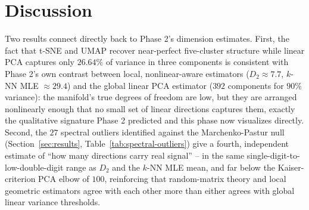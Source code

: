 \documentclass[11pt]{article}
\begin{document}
\section{Discussion}
\label{sec:discussion}

Two results connect directly back to Phase 2's dimension estimates. First,
the fact that t-SNE and UMAP recover near-perfect five-cluster structure
while linear PCA captures only $26.64\%$ of variance in three components
is consistent with Phase 2's own contrast between local, nonlinear-aware
estimators ($D_2 \approx 7.7$, $k$-NN MLE $\approx 29.4$) and the global
linear PCA estimator ($392$ components for $90\%$ variance): the manifold's
true degrees of freedom are low, but they are arranged nonlinearly enough
that no small set of linear directions captures them, exactly the
qualitative signature Phase 2 predicted and this phase now visualizes
directly. Second, the $27$ spectral outliers identified against the
Marchenko-Pastur null (Section~\ref{sec:results}, Table~\ref{tab:spectral-outliers})
give a fourth, independent estimate of ``how many directions carry real
signal'' -- in the same single-digit-to-low-double-digit range as $D_2$
and the $k$-NN MLE mean, and far below the Kaiser-criterion PCA elbow of
$100$, reinforcing that random-matrix theory and local geometric
estimators agree with each other more than either agrees with global
linear variance thresholds.
\end{document}
